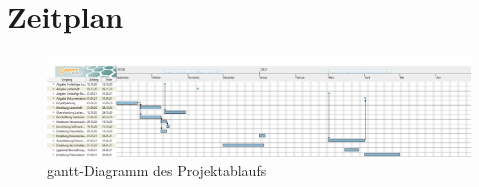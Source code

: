 \section{Zeitplan}\label{zeitplan}
\begin{figure}[ht!]
	\includegraphics[width=1\textwidth]{img/TAR_FKMS_20202021.png}
	\caption[gantt-Diagramm des Projektablaufs]{gantt-Diagramm des Projektablaufs}
 	\label{fig:gantt-diagramm}
\end{figure}
\newpage